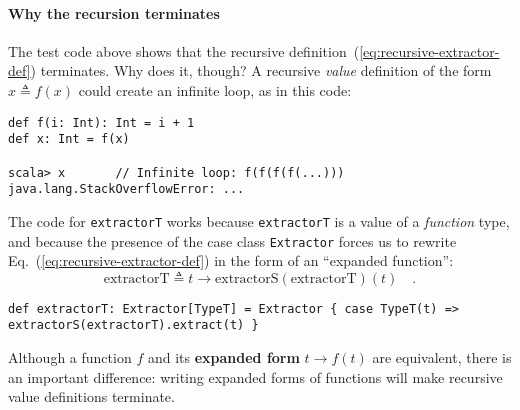\paragraph{Why the recursion terminates}

The test code above shows that the recursive definition~(\ref{eq:recursive-extractor-def})
terminates. Why does it, though? A recursive \emph{value} definition
of the form $x\triangleq f(x)$ could create an infinite loop, as
in this code:
\begin{lstlisting}
def f(i: Int): Int = i + 1
def x: Int = f(x)

scala> x       // Infinite loop: f(f(f(f(...)))
java.lang.StackOverflowError: ...
\end{lstlisting}
The code for \lstinline!extractorT! works because \lstinline!extractorT!
is a value of a \emph{function} type, and because the presence of
the case class \lstinline!Extractor! forces us to rewrite Eq.~(\ref{eq:recursive-extractor-def})
in the form of an \textsf{``}expanded function\textsf{''}:
\[
\text{extractorT}\triangleq t\rightarrow\text{extractorS}\left(\text{extractorT}\right)(t)\quad.
\]
\begin{lstlisting}
def extractorT: Extractor[TypeT] = Extractor { case TypeT(t) => extractorS(extractorT).extract(t) }
\end{lstlisting}
Although a function $f$ and its \textbf{expanded form} 
$t\rightarrow f(t)$ are equivalent, there is an important difference:
writing expanded forms of functions will make recursive value definitions
 terminate.

